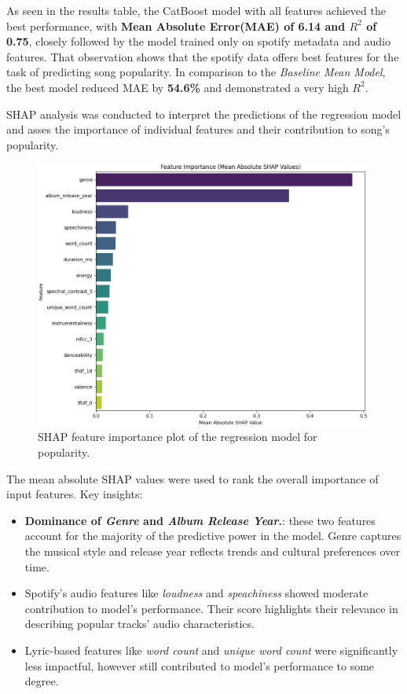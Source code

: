 As seen in the results table, the CatBoost model with all features achieved the
best performance, with \textbf{Mean Absolute Error(MAE) of \textbf{6.14} and
$R^2$ of 0.75}, closely followed by the model trained only on spotify metadata
and audio features. That observation shows that the spotify data offers  best
features for the task of predicting song popularity. In comparison to the
\textit{Baseline Mean Model}, the best model reduced MAE by \textbf{54.6\%} and
demonstrated a very high $R^2$.


SHAP analysis was conducted to interpret the predictions of the regression
model and asses the importance of individual features and their contribution to
song's popularity.


\begin{center}
\begin{figure}[H]
  \centering
  \includegraphics[width=5in]{img/feature_importance_popularity_reg.png}
  \caption{SHAP feature importance plot of the regression model for popularity.}
  \label{Figure:fig_beh}
\end{figure}
\end{center}


The mean absolute SHAP values were used to rank the overall importance of input
features. Key insights:
\begin{itemize}
  \item \textbf{Dominance of \textit{Genre} and \textit{Album Release Year}.}:
    these two features account for the majority of the predictive power in the
    model. Genre captures the musical style and release year reflects trends
    and cultural preferences over time.
  \item Spotify's audio features like \textit{loudness} and
    \textit{speachiness} showed moderate contribution to model's performance.
    Their score highlights their relevance in describing popular tracks' audio
    characteristics.
  \item Lyric-based features like \textit{word count} and \textit{unique word
    count} were significantly less impactful, however still contributed to
    model's performance to some degree.
\end{itemize}

